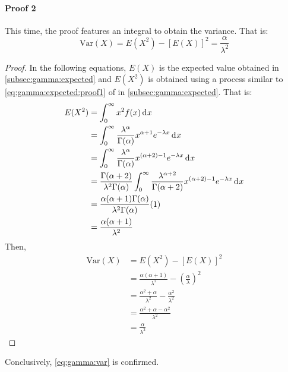 \documentclass[12pt]{article}
\begin{document}
\paragraph{Proof 2}
This time, the proof features an integral to obtain the variance. That is:
\begin{equation}\label{eq:gamma:var:proof2}
	\text{Var}(X) = E(X^2)-[E(X)]^2 = \frac{\alpha}{\lambda^2}
\end{equation}
\begin{proof}
	In the following equations, $E(X)$ is the expected value obtained in \autoref{subsec:gamma:expected} and $E(X^2)$ is
	obtained using a process similar to \autoref{eq:gamma:expected:proof1} of  in
	\autoref{subsec:gamma:expected}. That is:
	\begin{equation}
		\begin{split}
			E(X^2)	&=	\int^\infty_0 x^2f(x)\mathop{}\!\mathrm{d^{}}x\\
					&=	\int^\infty_0 \frac{\lambda^\alpha}{\Gamma(\alpha)}x^{\alpha+1} e^{-\lambda x}\mathop{}\!\mathrm{d^{}}x\\
					&=	\int^\infty_0 \frac{\lambda^\alpha}{\Gamma(\alpha)}x^{(\alpha+2)-1} e^{-\lambda x}\mathop{}\!\mathrm{d^{}}x\\
					&=	\frac{\Gamma(\alpha+2)}{\lambda^2\Gamma(\alpha)} \int^\infty_0 \frac{\lambda^{\alpha+2}}{\Gamma(\alpha+2)}x^{(\alpha+2)-1} e^{-\lambda x}\mathop{}\!\mathrm{d^{}}x\\
					&=	\frac{\alpha(\alpha+1)\Gamma(\alpha)}{\lambda^2\Gamma(\alpha)}(1)\\
					&=	\frac{\alpha(\alpha+1)}{\lambda^2}
		\end{split}
	\end{equation}
	Then,
	\begin{equation}
		\begin{split}
			\text{Var}(X)	&=	E(X^2)-[E(X)]^2\\
							&=	\frac{\alpha(\alpha+1)}{\lambda^2} - \left(\frac{\alpha}{\lambda}\right)^2\\
							&=	\frac{\alpha^2+\alpha}{\lambda^2} - \frac{\alpha^2}{\lambda^2}\\
							&=	\frac{\alpha^2 + \alpha -\alpha^2}{\lambda^2}\\
							&=	\frac{\alpha}{\lambda^2}
		\end{split}
	\end{equation}
\end{proof}
Conclusively, \autoref{eq:gamma:var} is confirmed.

\end{document}
